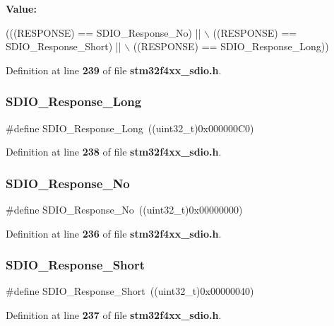 {\bfseries Value\+:}
\begin{DoxyCode}
(((RESPONSE) == SDIO_Response_No) || \(\backslash\)
                                    ((RESPONSE) == SDIO_Response_Short) || \(\backslash\)
                                    ((RESPONSE) == SDIO_Response_Long))
\end{DoxyCode}


Definition at line \textbf{ 239} of file \textbf{ stm32f4xx\+\_\+sdio.\+h}.

\mbox{\label{group__SDIO__Response__Type_ga1a11a8750612b344214f846784046bb0}} 
\subsubsection{S\+D\+I\+O\+\_\+\+Response\+\_\+\+Long}
{\footnotesize\ttfamily \#define S\+D\+I\+O\+\_\+\+Response\+\_\+\+Long~((uint32\+\_\+t)0x000000\+C0)}



Definition at line \textbf{ 238} of file \textbf{ stm32f4xx\+\_\+sdio.\+h}.

\mbox{\label{group__SDIO__Response__Type_ga308b8ef0e79ba451644dda923bb3ac41}} 
\subsubsection{S\+D\+I\+O\+\_\+\+Response\+\_\+\+No}
{\footnotesize\ttfamily \#define S\+D\+I\+O\+\_\+\+Response\+\_\+\+No~((uint32\+\_\+t)0x00000000)}



Definition at line \textbf{ 236} of file \textbf{ stm32f4xx\+\_\+sdio.\+h}.

\mbox{\label{group__SDIO__Response__Type_ga1f61768f90641648fd5c12e8d2f7e508}} 
\subsubsection{S\+D\+I\+O\+\_\+\+Response\+\_\+\+Short}
{\footnotesize\ttfamily \#define S\+D\+I\+O\+\_\+\+Response\+\_\+\+Short~((uint32\+\_\+t)0x00000040)}



Definition at line \textbf{ 237} of file \textbf{ stm32f4xx\+\_\+sdio.\+h}.

